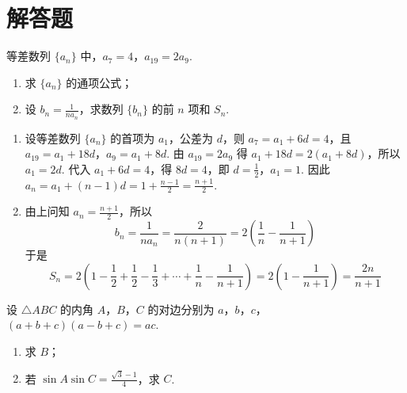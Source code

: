 \section{解答题}

\begin{problem}
等差数列 \(\{a_{n}\}\) 中，\(a_{7} = 4\)，\(a_{19} = 2a_{9}\).

\begin{enumerate}
\item 求 \(\{a_{n}\}\) 的通项公式；
\item 设 \(b_n = \frac{1}{na_n}\)，求数列 \(\{b_n\}\) 的前 \(n\) 项和 \(S_n\).
\end{enumerate}
\end{problem}

\begin{solution}
\begin{enumerate}
\item 设等差数列 \(\{a_n\}\) 的首项为 \(a_1\)，公差为 \(d\)，则
\(a_7=a_1+6d=4\)，且 \(a_{19}=a_1+18d\)，\(a_9=a_1+8d\).
由 \(a_{19}=2a_9\) 得 \(a_1+18d=2(a_1+8d)\)，所以 \(a_1=2d\).
代入 \(a_1+6d=4\)，得 \(8d=4\)，即 \(d=\frac{1}{2}\)，\(a_1=1\).
因此
\(a_n=a_1+(n-1)d=1+\frac{n-1}{2}=\frac{n+1}{2}\).

\item 由上问知 \(a_n=\frac{n+1}{2}\)，所以
\[
b_n=\frac{1}{na_n}=\frac{2}{n(n+1)}=2\left(\frac{1}{n}-\frac{1}{n+1}\right)
\]
于是
\[
S_n=2\left(1-\frac{1}{2}+\frac{1}{2}-\frac{1}{3}+\cdots+\frac{1}{n}-\frac{1}{n+1}\right)=2\left(1-\frac{1}{n+1}\right)=\frac{2n}{n+1}
\]
\end{enumerate}
\end{solution}

\begin{problem}
设 \(\triangle ABC\) 的内角 \(A\)，\(B\)，\(C\) 的对边分别为 \(a\)，\(b\)，\(c\)，\((a + b + c)(a - b + c) = ac\).

\begin{enumerate}
\item 求 \(B\)；
\item 若 \(\sin A \sin C = \frac{\sqrt{3} - 1}{4}\)，求 \(C\).
\end{enumerate}
\end{problem}

